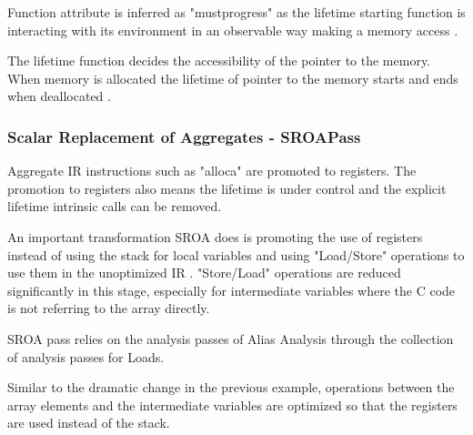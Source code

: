  Function attribute is inferred as "mustprogress" as the lifetime starting function is interacting with its environment in an observable way making a memory access \cite{llvmref-funcAttrs}. 
 \par
The lifetime function decides the accessibility of the pointer to the memory. When memory is allocated the lifetime of pointer to the memory starts and ends when deallocated \cite{llvmref-objectLifetime}.

\subsubsection{Scalar Replacement of Aggregates - SROAPass}

Aggregate IR instructions such as "alloca" are promoted to registers. The promotion to registers also means the lifetime is under control and the explicit lifetime intrinsic calls can be removed.

 
 

An important transformation SROA does is promoting the use of registers instead of using the stack for local variables and using "Load/Store" operations to use them in the unoptimized IR \cite{llvmcode-sroa}. "Store/Load" operations are reduced significantly in this stage, especially for intermediate variables where the C code is not referring to the array directly. 

SROA pass relies on the analysis passes of Alias Analysis through the collection of analysis passes for Loads.



 

 

Similar to the dramatic change in the previous example, operations between the array elements and the intermediate variables are optimized so that the registers are used instead of the stack.


